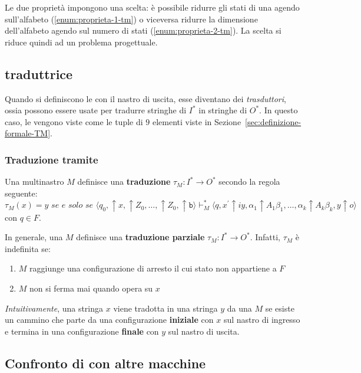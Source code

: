 \documentclass[italian, 10pt]{article}
\newcommand{\blank}{\texttt{b}} %
\begin{document}
Le due proprietà impongono una scelta: è possibile ridurre gli stati di una \TM agendo sull'alfabeto (\ref{enum:proprieta-1-tm}) o viceversa ridurre la dimensione dell'alfabeto agendo sul numero di stati (\ref{enum:proprieta-2-tm}).
La scelta si riduce quindi ad un problema progettuale.

\subsection{\TM traduttrice}
\label{sec:TM-traduttrice}

Quando si definiscono le \TM con il nastro di uscita, esse diventano dei \textit{trasduttori}, ossia possono essere usate per tradurre stringhe di \(I^\ast\) in stringhe di \(O^\ast\).
In questo caso, le \TM vengono viste come le tuple di \(9\) elementi viste in Sezione~\ref{sec:definizione-formale-TM}.

\subsubsection{Traduzione tramite \TM}

Una \TM multinastro \(M\) definisce una \textbf{traduzione} \(\tau_M: I^\ast \rightarrow O^\ast\) secondo la regola seguente:
\[ \tau_M(x) = y \textit{ se e solo se } \langle q_0, \uparrow x, \uparrow Z_0, \ldots, \uparrow Z_0, \uparrow \blank \rangle \vdash^\ast_M \langle q, x^\prime \uparrow iy, \alpha_1 \uparrow A_1 \beta_1, \ldots, \alpha_k \uparrow A_k \beta_k, y \uparrow o \rangle \]
con \(q \in F\).

In generale, una \TM \(M\) definisce una \textbf{traduzione parziale} \(\tau_M: I^\ast \rightarrow O^\ast\).
Infatti, \(\tau_M\) è indefinita se:
\begin{enumerate}
  \item \(M\) raggiunge una configurazione di arresto il cui stato non appartiene a \(F\)
  \item \(M\) non si ferma mai quando opera su \(x\)
\end{enumerate}

\bigskip
\textit{Intuitivamente}, una stringa \(x\) viene tradotta in una stringa \(y\) da una \TM \(M\) se esiste un cammino che parte da una configurazione \textbf{iniziale} con \(x\) sul nastro di ingresso e termina in una configurazione \textbf{finale} con \(y\) sul nastro di uscita.

\subsection{Confronto di \TM con altre macchine}
\end{document}
